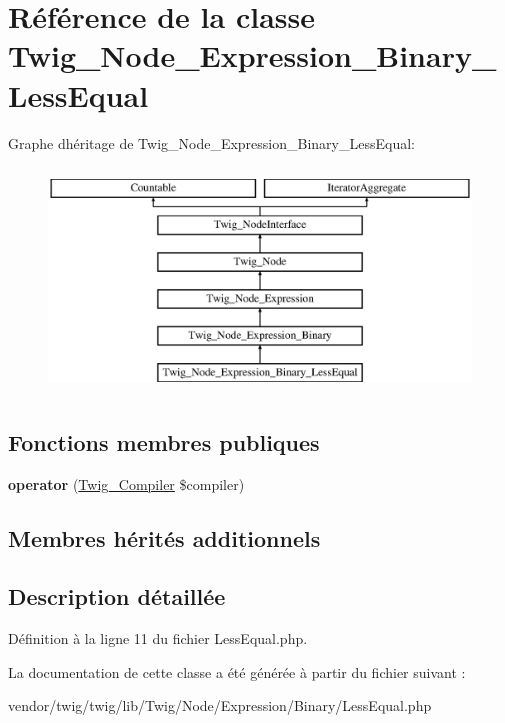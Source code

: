 \hypertarget{class_twig___node___expression___binary___less_equal}{}\section{Référence de la classe Twig\+\_\+\+Node\+\_\+\+Expression\+\_\+\+Binary\+\_\+\+Less\+Equal}
\label{class_twig___node___expression___binary___less_equal}
Graphe d\textquotesingle{}héritage de Twig\+\_\+\+Node\+\_\+\+Expression\+\_\+\+Binary\+\_\+\+Less\+Equal\+:\begin{figure}[H]
\begin{center}
\leavevmode
\includegraphics[height=6.000000cm]{class_twig___node___expression___binary___less_equal}
\end{center}
\end{figure}
\subsection*{Fonctions membres publiques}
\begin{DoxyCompactItemize}
\item 
{\bfseries operator} (\hyperlink{class_twig___compiler}{Twig\+\_\+\+Compiler} \$compiler)\hypertarget{class_twig___node___expression___binary___less_equal_af77318ec88d5f8a508684970a150b670}{}\label{class_twig___node___expression___binary___less_equal_af77318ec88d5f8a508684970a150b670}

\end{DoxyCompactItemize}
\subsection*{Membres hérités additionnels}


\subsection{Description détaillée}


Définition à la ligne 11 du fichier Less\+Equal.\+php.



La documentation de cette classe a été générée à partir du fichier suivant \+:\begin{DoxyCompactItemize}
\item 
vendor/twig/twig/lib/\+Twig/\+Node/\+Expression/\+Binary/Less\+Equal.\+php\end{DoxyCompactItemize}
